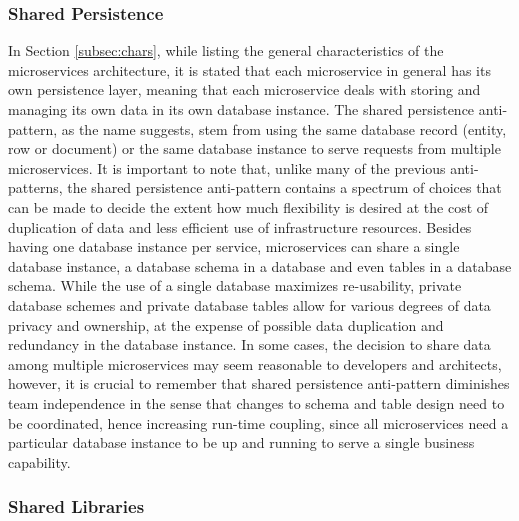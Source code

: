 \documentclass{Configuration_Files/PoliMi3i_thesis}
\begin{document}
\subsubsection{Shared Persistence}
\label{subsubsec:shared_persistence}

In Section \ref{subsec:chars}, while listing the general characteristics of the microservices architecture, it is stated that each microservice in general has its own persistence layer, meaning that each microservice deals with storing and managing its own data in its own database instance.
The shared persistence anti-pattern, as the name suggests, stem from using the same database record (entity, row or document) or the same database instance to serve requests from multiple microservices.
It is important to note that, unlike many of the previous anti-patterns, the shared persistence anti-pattern contains a spectrum of choices that can be made to decide the extent how much flexibility is desired at the cost of duplication of data and less efficient use of infrastructure resources.
Besides having one database instance per service, microservices can share a single database instance, a database schema in a database and even tables in a database schema.
While the use of a single database maximizes re-usability, private database schemes and private database tables allow for various degrees of data privacy and ownership, at the expense of possible data duplication and redundancy in the database instance.
In some cases, the decision to share data among multiple microservices may seem reasonable to developers and architects, however, it is crucial to remember that shared persistence anti-pattern diminishes team independence in the sense that changes to schema and table design need to be coordinated, hence increasing run-time coupling, since all microservices need a particular database instance to be up and running to serve a single business capability.

\subsubsection{Shared Libraries}
\label{subsubsec:shared_libraries}
\end{document}
